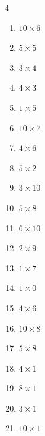 \begin{multicols}{4}
\begin{enumerate}
  \item $10\times 6$
        \phantom{$=60$}

  \item $5\times 5$
        \phantom{$=25$}

  \item $3\times 4$
        \phantom{$=12$}

  \item $4\times 3$
        \phantom{$=12$}

  \item $1\times 5$
        \phantom{$=5$}

  \item $10\times 7$
        \phantom{$=70$}

  \item $4\times 6$
        \phantom{$=24$}

  \item $5\times 2$
        \phantom{$=10$}

  \item $3\times 10$
        \phantom{$=30$}

  \item $5\times 8$
        \phantom{$=40$}

  \item $6\times 10$
        \phantom{$=60$}

  \item $2\times 9$
        \phantom{$=18$}

  \item $1\times 7$
        \phantom{$=7$}

  \item $1\times 0$
        \phantom{$=0$}

  \item $4\times 6$
        \phantom{$=24$}

  \item $10\times 8$
        \phantom{$=80$}

  \item $5\times 8$
        \phantom{$=40$}

  \item $4\times 1$
        \phantom{$=4$}

  \item $8\times 1$
        \phantom{$=8$}

  \item $3\times 1$
        \phantom{$=3$}

  \item $10\times 1$
        \phantom{$=10$}


\end{enumerate}
\end{multicols}
